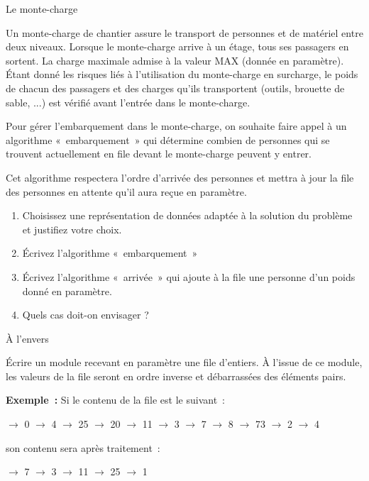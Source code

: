 	\begin{Exercice}{Le monte-charge}
		
		Un monte-charge de chantier assure le transport de personnes 
		et de matériel entre deux niveaux. Lorsque le monte-charge
		arrive à un étage, tous ses passagers en sortent. La charge
		maximale admise à la valeur MAX (donnée en paramètre).
		Étant donné les risques liés à l'utilisation du monte-charge 
		en surcharge, le poids de chacun des passagers et des
		charges qu'ils transportent (outils, brouette de sable, ...) 
		est vérifié avant l'entrée dans le monte-charge.

		Pour gérer l'embarquement dans le monte-charge, on souhaite 
		faire appel à un algorithme «~embarquement~» qui détermine
		combien de personnes qui se trouvent actuellement 
		en file devant le monte-charge peuvent y entrer.

		Cet algorithme respectera l'ordre d'arrivée des personnes 
		et mettra à jour la file des personnes en attente qu'il aura
		reçue en paramètre.

		\begin{enumerate}
			\item {
				Choisissez une représentation de données adaptée à la solution du problème et justifiez votre choix. }
			\item {
				Écrivez l'algorithme «~embarquement~»}
			\item {
				Écrivez l'algorithme «~arrivée~» qui ajoute à la file une personne d'un poids donné en paramètre.}
			\item {
				Quels cas doit-on envisager ?}
		\end{enumerate}

	\end{Exercice}

	\begin{Exercice}{À l'envers}
	
		Écrire un module recevant en paramètre une file d'entiers. 
		À l'issue de ce module, les valeurs de la file seront en
		ordre inverse et débarrassées des éléments pairs.

		\textbf{Exemple~:} Si le contenu de la file est le suivant~:

		{ $\rightarrow $ 0 $\rightarrow $ 4 
		$\rightarrow $ 25 $\rightarrow $ 20 
		$\rightarrow $ 11 $\rightarrow $ 3 $\rightarrow
		$ 7 $\rightarrow $ 8 $\rightarrow $ 73 
		$\rightarrow $ 2 $\rightarrow $ 4
		\par}

		son contenu sera après traitement~: 

		{ $\rightarrow $ 7 $\rightarrow $ 3 $\rightarrow 
		$ 11 $\rightarrow $ 25 $\rightarrow $ 1
		\par}

\end{Exercice}
	
		